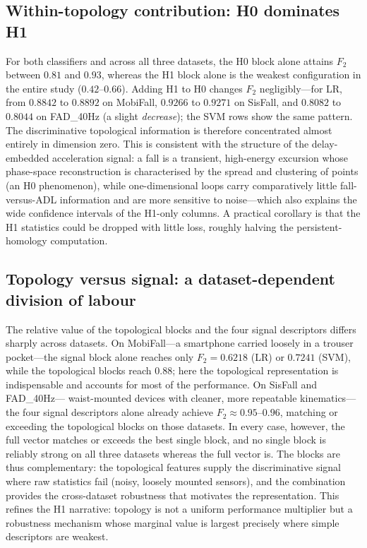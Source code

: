 \subsection{Within-topology contribution: H0 dominates H1}

For both classifiers and across all three datasets, the H0 block alone attains $F_2$
between $0.81$ and $0.93$, whereas the H1 block alone is the weakest configuration in
the entire study ($0.42$--$0.66$).  Adding H1 to H0 changes $F_2$ negligibly---for LR,
from $0.8842$ to $0.8892$ on MobiFall, $0.9266$ to $0.9271$ on SisFall, and $0.8082$
to $0.8044$ on FAD\_40Hz (a slight \emph{decrease}); the SVM rows show the same pattern.
The discriminative topological information is therefore concentrated almost entirely in
dimension zero.  This is consistent with the structure of the delay-embedded
acceleration signal: a fall is a transient, high-energy excursion whose phase-space
reconstruction is characterised by the spread and clustering of points (an H0
phenomenon), while one-dimensional loops carry comparatively little fall-versus-ADL
information and are more sensitive to noise---which also explains the wide confidence
intervals of the H1-only columns.  A practical corollary is that the H1 statistics
could be dropped with little loss, roughly halving the persistent-homology computation.

\subsection{Topology versus signal: a dataset-dependent division of labour}

The relative value of the topological blocks and the four signal descriptors differs
sharply across datasets.  On MobiFall---a smartphone carried loosely in a trouser
pocket---the signal block alone reaches only $F_2 = 0.6218$ (LR) or $0.7241$ (SVM),
while the topological blocks reach $0.88$; here the topological representation is
indispensable and accounts for most of the performance.  On SisFall and FAD\_40Hz---%
waist-mounted devices with cleaner, more repeatable kinematics---the four signal
descriptors alone already achieve $F_2 \approx 0.95$--$0.96$, matching or exceeding the
topological blocks on those datasets.  In every case, however, the full vector matches
or exceeds the best single block, and no single block is reliably strong on all three
datasets whereas the full vector is.  The blocks are thus complementary: the
topological features supply the discriminative signal where raw statistics fail (noisy,
loosely mounted sensors), and the combination provides the cross-dataset robustness
that motivates the representation.  This refines the H1 narrative: topology is not a
uniform performance multiplier but a robustness mechanism whose marginal value is
largest precisely where simple descriptors are weakest.

